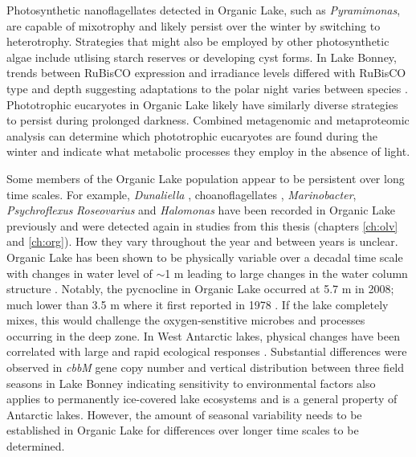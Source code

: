 Photosynthetic nanoflagellates detected in Organic Lake, such as \emph{Pyramimonas}, are capable of mixotrophy \cite{Bell2003} and likely persist over the winter by switching to heterotrophy.
Strategies that might also be employed by other photosynthetic algae include utlising starch reserves or developing cyst forms.
In Lake Bonney, trends between \acs{RuBisCO} expression and irradiance levels differed with \acs{RuBisCO} type and depth suggesting adaptations to the polar night varies between species \cite{Kong2012a}.
Phototrophic eucaryotes in Organic Lake likely have similarly diverse strategies to persist during prolonged darkness.
Combined metagenomic and metaproteomic analysis can determine which phototrophic eucaryotes are found during the winter and indicate what metabolic processes they employ in the absence of light.

Some members of the Organic Lake population appear to be persistent over long time scales.
For example, \emph{Dunaliella} \cite{Franzmann1987b}, choanoflagellates \cite{vandenHoff1986}, \emph{Marinobacter}, \emph{Psychroflexus} \emph{Roseovarius} and \emph{Halomonas} \cite{Bowman2000b} have been recorded in Organic Lake previously and were detected again in studies from this thesis (chapters \ref{ch:olv} and \ref{ch:org}).
How they vary throughout the year and between years is unclear.
Organic Lake has been shown to be physically variable over a decadal time scale with changes in water level of $\sim$1 m leading to large changes in the water column structure \cite{Gibson1995, Gibson1996}.
Notably, the pycnocline in Organic Lake occurred at 5.7 m in 2008; much lower than 3.5 m where it first reported in 1978 \cite{Franzmann1987b}.
If the lake completely mixes, this would challenge the oxygen-senstitive microbes and processes occurring in the deep zone.
In West Antarctic lakes, physical changes have been correlated with large and rapid ecological responses \cite{Quayle2002}.
Substantial differences were observed in \emph{cbbM} gene copy number and vertical distribution between three field seasons in Lake Bonney \cite{Kong2012b} indicating sensitivity to environmental factors also applies to permanently ice-covered lake ecosystems and is a general property of Antarctic lakes.
However, the amount of seasonal variability needs to be established in Organic Lake for differences over longer time scales to be determined.

